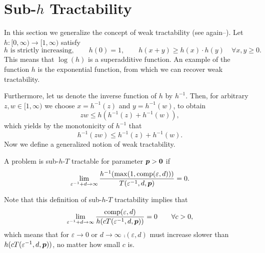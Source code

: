 \documentclass[sort&compress]{elsarticle}
\newcommand{\peter}[1]{\begingroup\color{purple}#1\endgroup}
\begin{document}




\section{Sub-$h$ Tractability}\label{sec:subh}
In this section we generalize the concept of weak tractability \peter{(see again\cite{NovWoz08a}--\cite{NovWoz12a})}.  Let  $h:[0,\infty) \to [1,\infty)$ satisfy
\begin{equation} \label{eq:h_cond}
	h \text{ is strictly increasing}, \qquad
	h(0)=1, \qquad
 h(x+y) \ge  h(x)\cdot h(y)  \quad \forall x,y \ge 0.
\end{equation}
This means that $\log(h)$ is a superadditive function.  An example of the function $h$ is the exponential function, from which we can recover weak tractability.

Furthermore, let us denote the inverse function of $h$ by $h^{-1}$.
Then, for arbitrary $z,w \in [1,\infty)$ we choose $x=h^{-1}(z)$ and $y=h^{-1}(w)$, to obtain
\[
z w \le h (h^{-1}(z)+h^{-1}(w)),
\]
which yields by the monotonicity of $h^{-1}$ that
\begin{equation}\label{eq:submult_h_inverse}
h^{-1}(z w) \le h^{-1}(z)+h^{-1}(w).
\end{equation}
Now we define a generalized notion of weak tractability.
\begin{definition} \label{def:subhT}
	A problem is sub-$h$-$T$ tractable for parameter $\boldsymbol{p} > \boldsymbol{0}$ if
	\begin{equation*}
		\lim_{\varepsilon^{-1} + d \to \infty} \frac{h^{-1}(\max(1,\operatorname{comp}(\varepsilon,d)))}{T(\varepsilon^{-1},d,\boldsymbol{p})} = 0.
	\end{equation*}
\end{definition}

Note that this definition of sub-$h$-$T$ tractability implies that
\begin{equation} \label{eq:comp_slow_hcT}
		\lim_{\varepsilon^{-1} + d \to \infty} \frac{\operatorname{comp}(\varepsilon,d)}{h(cT(\varepsilon^{-1},d,\boldsymbol{p}))} = 0 \qquad \forall c > 0,
\end{equation}
which means that for $\varepsilon \to 0$ or $d \to \infty$  $\comp(\varepsilon,d)$ must increase slower than $h(cT(\varepsilon^{-1},d,\boldsymbol{p}))$, no matter how small $c$ is.
\end{document}
